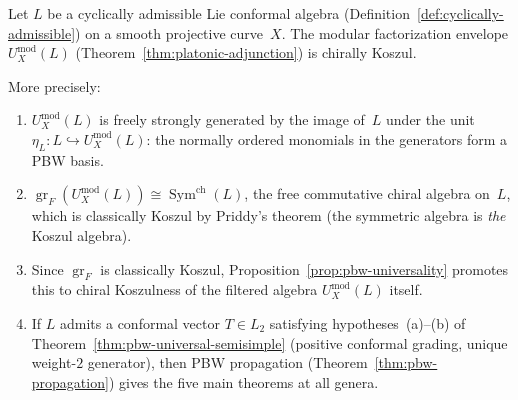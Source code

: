 \begin{theorem}\label{thm:envelope-koszul}
Let $L$ be a cyclically admissible Lie conformal algebra
\textup{(}Definition~\textup{\ref{def:cyclically-admissible}}\textup{)}
on a smooth projective curve~$X$.  The modular factorization
envelope $U_X^{\mathrm{mod}}(L)$
\textup{(}Theorem~\textup{\ref{thm:platonic-adjunction}}\textup{)}
is chirally Koszul.

More precisely:
\begin{enumerate}[label=\textup{(\roman*)}]
\item $U_X^{\mathrm{mod}}(L)$ is freely strongly generated
  by the image of~$L$ under the unit
  $\eta_L\colon L \hookrightarrow
  U_X^{\mathrm{mod}}(L)$: the normally ordered monomials
  in the generators form a PBW basis.
\item $\operatorname{gr}_F(U_X^{\mathrm{mod}}(L))
  \cong \operatorname{Sym}^{\mathrm{ch}}(L)$, the
  free commutative chiral algebra on~$L$, which is
  classically Koszul by Priddy's theorem
  \textup{(}the symmetric algebra is \emph{the}
  Koszul algebra\textup{)}.
\item Since $\operatorname{gr}_F$ is classically
  Koszul, Proposition~\textup{\ref{prop:pbw-universality}}
  promotes this to chiral Koszulness of the filtered
  algebra $U_X^{\mathrm{mod}}(L)$ itself.
\item If $L$ admits a conformal vector
  $T \in L_2$ satisfying
  hypotheses~\textup{(a)--(b)} of
  Theorem~\textup{\ref{thm:pbw-universal-semisimple}}
  \textup{(}positive conformal grading, unique
  weight-$2$ generator\textup{)}, then PBW propagation
  \textup{(}Theorem~\textup{\ref{thm:pbw-propagation}}\textup{)}
  gives the five main theorems at all genera.
\end{enumerate}
\end{theorem}

